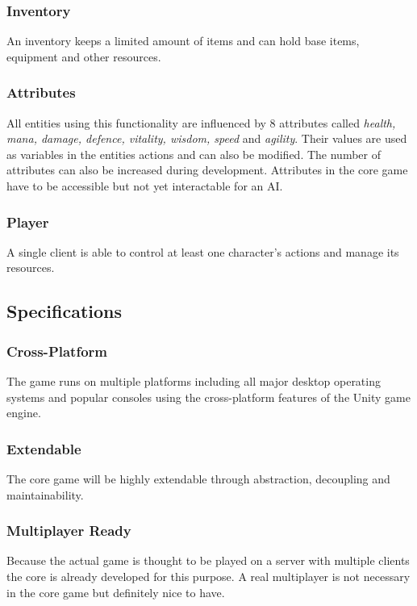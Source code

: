 \documentclass[11pt]{article}
\begin{document}
\subsubsection{Inventory}
An inventory keeps a limited amount of items and can hold base items, equipment and other resources.
\subsubsection{Attributes}
All entities using this functionality are influenced by 8 attributes called \textit{health, mana, damage, defence, vitality, wisdom, speed} and \textit{agility}. 
Their values are used as variables in the entities actions and can also be modified. The number of attributes can also be increased during development.
Attributes in the core game have to be accessible but not yet interactable for an AI.
\subsubsection{Player}
A single client is able to control at least one character's actions and manage its resources.

\subsection{Specifications}
\subsubsection{Cross-Platform}
The game runs on multiple platforms including all major desktop operating systems and popular consoles using the cross-platform features of the Unity game engine.
\subsubsection{Extendable}
The core game will be highly extendable through abstraction, decoupling and maintainability.
\subsubsection{Multiplayer Ready}
Because the actual game is thought to be played on a server with multiple clients the core is already developed for this purpose.
A real multiplayer is not necessary in the core game but definitely nice to have.

\newpage
\end{document}
